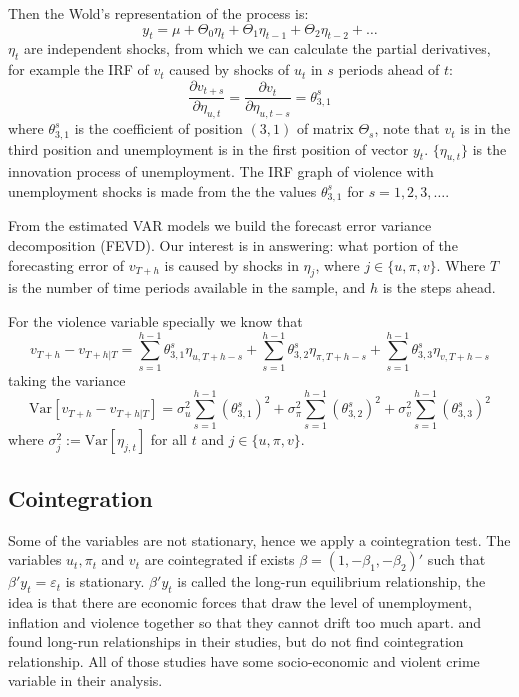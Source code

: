 \documentclass[11pt, a4paper]{article}
\newcommand{\Var}{\mathrm{Var}}
\begin{document}
Then the Wold's representation of the process is:
$$ y_t = \mu + \Theta_0 \eta_t + \Theta_1 \eta_{t-1} + \Theta_2 \eta_{t-2} + \dots  $$
$\eta_t$ are independent shocks, from which we can calculate the partial derivatives, for example the IRF of $v_t$ caused by shocks of $u_t$ in $s$ periods ahead of $t$:
$$ \frac{\partial v_{t+s} }{\partial \eta_{u,t}  } = \frac{\partial v_{t} }{\partial \eta_{u,t-s}} = \theta^{s}_{3,1}  $$
where $\theta^{s}_{3,1}$ is the coefficient of position $(3,1)$ of matrix $\Theta_s$, note that $v_t$ is in the third position and unemployment is in the first position of vector $y_t$. $\{\eta_{u,t}\}$ is the innovation process  of unemployment. 
The IRF graph of violence with unemployment shocks  is made from the the values $\theta^{s}_{3,1} $ for $s = 1, 2, 3, \dots$.

From the estimated VAR models we build the forecast error variance decomposition (FEVD). Our interest is in answering: what portion of the forecasting error of $v_{T+h}$ is caused by shocks in $\eta_j$, where $j \in \{u,\pi,v \}$. Where $T$ is the number of time periods available in the sample, and $h$ is the steps ahead.

For the violence variable specially we know that
$$ v_{T+h} - v_{T+h|T} = \sum\limits^{h-1}_{s=1} \theta^{s}_{3,1} \eta_{u,T+h-s} + \sum\limits^{h-1}_{s=1} \theta^{s}_{3,2} \eta_{\pi,T+h-s} + \sum\limits^{h-1}_{s=1} \theta^{s}_{3,3} \eta_{v,T+h-s} $$
taking the variance
$$ \Var[v_{T+h} - v_{T+h|T}] =  \sigma^2_{u} \sum\limits^{h-1}_{s=1} ( \theta^{s}_{3,1}  )^2 +  \sigma^2_{\pi} \sum\limits^{h-1}_{s=1} ( \theta^{s}_{3,2}  )^2 +  \sigma^2_{v} \sum\limits^{h-1}_{s=1} ( \theta^{s}_{3,3}  )^2 $$
where $\sigma^2_{j} := \Var[\eta_{j,t}]$ for all $t$ and $j \in \{u,\pi,v \}$.


\subsection{Cointegration}

Some of the variables are not stationary, hence we apply a cointegration test. The variables $u_t,\pi_t$ and $v_t$ are  cointegrated if exists $\beta = (1, -\beta_1, - \beta_2)'$ such that $ \beta' y_t = \varepsilon_t $  is stationary.  $\beta' y_t$ is called the long-run equilibrium relationship, the idea is that there are economic forces that draw the level of unemployment, inflation and violence together so that they cannot drift too much apart. \cite{tang2009} and \cite{saridakis2011} found long-run relationships in their studies, but \cite{santos_kassouf2014}
do not find cointegration relationship. All of those studies have some socio-economic and violent crime variable in their analysis.
\end{document}
